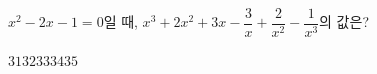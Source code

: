 $x^2-2x-1=0$일 때, $x^3+2x^2+3x-\dfrac{3}{x}+\dfrac{2}{x^2}-\dfrac{1}{x^3}$의 값은?
\begin{choices32}{$31$}{$32$}{$33$}{$34$}{$35$}\end{choices32}
